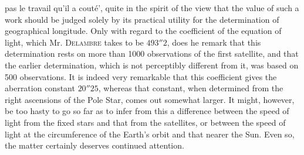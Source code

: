 pas le travail qu'il a couté', quite in the spirit of the view that the value of such a work should be judged solely by its practical utility for the determination of geographical longitude. Only with regard to the coefficient of the equation of light, which Mr. \textsc{Delambre} takes to be $493''2$, does he remark that this determination rests on more than 1000 observations of the first satellite, and that the earlier determination, which is not perceptibly different from it, was based on 500 observations. It is indeed very remarkable that this coefficient gives the aberration constant $20''25$, whereas that constant, when determined from the right ascensions of the Pole Star, comes out somewhat larger. It might, however, be too hasty to go so far as to infer from this a difference between the speed of light from the fixed stars and that from the satellites, or between the speed of light at the circumference of the Earth's orbit and that nearer the Sun. Even so, the matter certainly deserves continued attention.
\par\clearpage\endgroup

